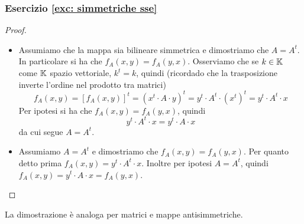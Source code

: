 \documentclass{article}     %
\begin{document}
\subsubsection*{Esercizio \ref{exc: simmetriche sse}}\label{sol: simmetriche sse}
\begin{proof}~
    \begin{itemize}
        \item [\say{$\Rarr$}] Assumiamo che la mappa sia bilineare simmetrica e dimostriamo che $A=A^t$. In particolare si ha che $f_A(x,y)=f_A(y,x)$. Osserviamo che se $k \in \mathbb{K}$ come $\mathbb{K}$ spazio vettoriale, $k^t=k$, quindi (ricordado che la trasposizione inverte l'ordine nel prodotto tra matrici)
        \[f_A(x,y)=[f_A(x,y)]^t=\left( x^t\cdot A \cdot y \right)^t= y^t\cdot  A^t \cdot \left( x^t \right)^t= y^t\cdot A^t \cdot x \] 
        Per ipotesi si ha che $f_A(x,y)=f_A(y,x)$, quindi 
        \[y^t\cdot A^t \cdot x= y^t\cdot A \cdot x\]
        da cui segue $A=A^t$.
        \item [\say{$\Larr$}] Assumiamo $A=A^t$ e dimostriamo che $f_A(x,y)=f_A(y,x)$. Per quanto detto prima $f_A(x,y)=y^t\cdot A^t\cdot x$. Inoltre per ipotesi $A=A^t$, quindi $f_A(x,y)=y^t\cdot A\cdot x=f_A(y,x)$.
    \end{itemize}
\end{proof}
La dimostrazione è analoga per matrici e mappe antisimmetriche.
\end{document}
